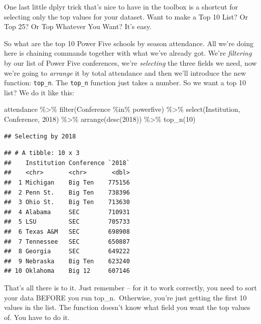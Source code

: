 \documentclass[
]{book}
\newenvironment{Shaded}{\begin{snugshade}}{\end{snugshade}}
\newcommand{\AttributeTok}[1]{\textcolor[rgb]{0.77,0.63,0.00}{#1}}
\newcommand{\DecValTok}[1]{\textcolor[rgb]{0.00,0.00,0.81}{#1}}
\newcommand{\FunctionTok}[1]{\textcolor[rgb]{0.00,0.00,0.00}{#1}}
\newcommand{\NormalTok}[1]{#1}
\newcommand{\SpecialCharTok}[1]{\textcolor[rgb]{0.00,0.00,0.00}{#1}}
\newcommand{\StringTok}[1]{\textcolor[rgb]{0.31,0.60,0.02}{#1}}
\begin{document}
One last little dplyr trick that's nice to have in the toolbox is a shortcut for selecting only the top values for your dataset. Want to make a Top 10 List? Or Top 25? Or Top Whatever You Want? It's easy.

So what are the top 10 Power Five schools by season attendance. All we're doing here is chaining commands together with what we've already got. We're \emph{filtering} by our list of Power Five conferences, we're \emph{selecting} the three fields we need, now we're going to \emph{arrange} it by total attendance and then we'll introduce the new function: \texttt{top\_n}. The \texttt{top\_n} function just takes a number. So we want a top 10 list? We do it like this:

\begin{Shaded}
\begin{Highlighting}[]
\NormalTok{attendance }\SpecialCharTok{\%\textgreater{}\%} \FunctionTok{filter}\NormalTok{(Conference }\SpecialCharTok{\%in\%}\NormalTok{ powerfive) }\SpecialCharTok{\%\textgreater{}\%} \FunctionTok{select}\NormalTok{(Institution, Conference, }\StringTok{\textasciigrave{}}\AttributeTok{2018}\StringTok{\textasciigrave{}}\NormalTok{) }\SpecialCharTok{\%\textgreater{}\%} \FunctionTok{arrange}\NormalTok{(}\FunctionTok{desc}\NormalTok{(}\StringTok{\textasciigrave{}}\AttributeTok{2018}\StringTok{\textasciigrave{}}\NormalTok{)) }\SpecialCharTok{\%\textgreater{}\%} \FunctionTok{top\_n}\NormalTok{(}\DecValTok{10}\NormalTok{)}
\end{Highlighting}
\end{Shaded}

\begin{verbatim}
## Selecting by 2018
\end{verbatim}

\begin{verbatim}
## # A tibble: 10 x 3
##    Institution Conference `2018`
##    <chr>       <chr>       <dbl>
##  1 Michigan    Big Ten    775156
##  2 Penn St.    Big Ten    738396
##  3 Ohio St.    Big Ten    713630
##  4 Alabama     SEC        710931
##  5 LSU         SEC        705733
##  6 Texas A&M   SEC        698908
##  7 Tennessee   SEC        650887
##  8 Georgia     SEC        649222
##  9 Nebraska    Big Ten    623240
## 10 Oklahoma    Big 12     607146
\end{verbatim}

That's all there is to it. Just remember -- for it to work correctly, you need to sort your data BEFORE you run top\_n.~Otherwise, you're just getting the first 10 values in the list. The function doesn't know what field you want the top values of. You have to do it.
\end{document}
